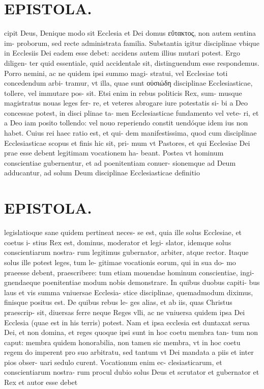 \documentclass{article}
\begin{document}
\begin{pages}
\section*{EPISTOLA. }\pstart cipit Deus, Denique modo sit Ecclesia et Dei domus εὔτακτος, non autem sentina im- proborum, sed recte administrata familia. Substantia igitur disciplinae vbique in Ecclesiis Dei eadem esse debet: accidens autem illius mutari potest. Ergo diligen- ter quid essentiale, quid accidentale sit, distinguendum esse respondemus. Porro nemini, ac ne quidem ipsi summo magi- stratui, vel Ecclesiae toti concedendum arbi- tramur, vt illa, quae sunt οὐσιώδη disciplinae Ecclesiasticae, tollere, vel immutare pos- sit. Etsi enim in rebus politicis Rex, sum- musque magistratus nouas leges fer- re, et veteres abrogare iure potestatis si- bi a Deo concessae potest, in disci plinae ta- men Ecclesiasticae fundamento vel vete- ri, et a Deo iam posito tollendo: vel nouo reperiendo constit uendóque idem ius non habet. Cuius rei haec ratio est, et qui- dem manifestissima, quod cum disciplinae Ecclesiasticae scopus et finis hic sit, pri- mum vt Pastores, et qui Ecclesiae Dei prae esse debent legitimam vocationem ha- beant. Postea vt hominum conscientiae gubernentur, et ad poenitentiam conuer- sionemque ad Deum adducantur, ad solum Deum disciplinae Ecclesiasticae definitio  \pend
\section*{EPISTOLA. }\pstart legislatioque sane quidem pertineat neces- se est, quia ille solus Ecclesiae, et coetus i- stius Rex est, dominus, moderator et legi- slator, idemque solus conscientiarum nostra- rum legitimus gubernator, arbiter, atque rector. Itaque solus ille potest leges, tum le- gitimae vocationis eorum, qui in sua do- mo praeesse debent, praescribere: tum etiam mouendae hominum conscientiae, ingi- gnendaeque poenitentiae modum nobis demonstrare. In quibus duobus capiti- bus laus et vis summa vniuersae Ecclesia- stice disciplinae, quemadmodum diximus, finisque positus est. De quibus rebus le- ges alias, et ab iis, quas Christus praescrip- sit, diuersas ferre neque Reges vlli, ac ne vniuersa quidem ipsa Dei Ecclesia (quae est in his terris) potest. Nam et ipsa ecclesia est duntaxat serua Dei, et non domina, et reges quoque ipsi sunt in hoc coetu membra tan- tum non caput: membra quidem honorabilia, non tamen sic membra, vt in hoc coetu regem do imperent pro suo arbitratu, sed tantum vt Dei mandata a piis et inter pios obser- uari sedulo curent. Vocationum enim ec- clesiasticarum, et conscientiarum nostra- rum procul dubio solus Deus et scrutator et gubernator et Rex et autor esse debet  \pend

\end{pages}
\end{document}
